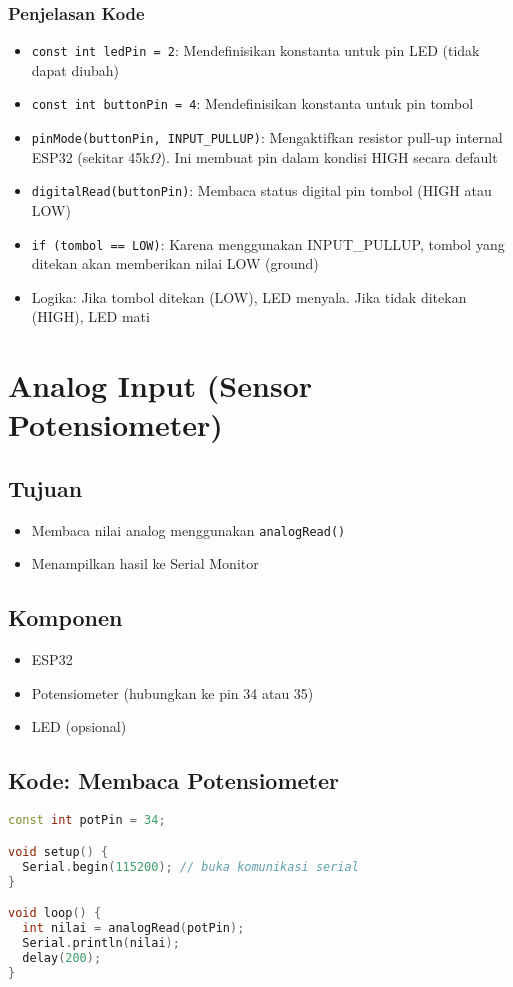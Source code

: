 \documentclass[12pt,a4paper]{article}
\begin{document}
\subsubsection{Penjelasan Kode}
\begin{itemize}
    \item \texttt{const int ledPin = 2}: Mendefinisikan konstanta untuk pin LED (tidak dapat diubah)
    \item \texttt{const int buttonPin = 4}: Mendefinisikan konstanta untuk pin tombol
    \item \texttt{pinMode(buttonPin, INPUT\_PULLUP)}: Mengaktifkan resistor pull-up internal ESP32 (sekitar 45k$\Omega$). Ini membuat pin dalam kondisi HIGH secara default
    \item \texttt{digitalRead(buttonPin)}: Membaca status digital pin tombol (HIGH atau LOW)
    \item \texttt{if (tombol == LOW)}: Karena menggunakan INPUT\_PULLUP, tombol yang ditekan akan memberikan nilai LOW (ground)
    \item Logika: Jika tombol ditekan (LOW), LED menyala. Jika tidak ditekan (HIGH), LED mati
\end{itemize}

\newpage
\section{Analog Input (Sensor Potensiometer)}

\subsection{Tujuan}
\begin{itemize}
    \item Membaca nilai analog menggunakan \texttt{analogRead()}
    \item Menampilkan hasil ke Serial Monitor
\end{itemize}

\subsection{Komponen}
\begin{itemize}
    \item ESP32
    \item Potensiometer (hubungkan ke pin 34 atau 35)
    \item LED (opsional)
\end{itemize}

\subsection{Kode: Membaca Potensiometer}
\begin{lstlisting}[language=C++, caption={Membaca Nilai Analog}]
const int potPin = 34;

void setup() {
  Serial.begin(115200); // buka komunikasi serial
}

void loop() {
  int nilai = analogRead(potPin);
  Serial.println(nilai);
  delay(200);
}
\end{lstlisting}
\end{document}
